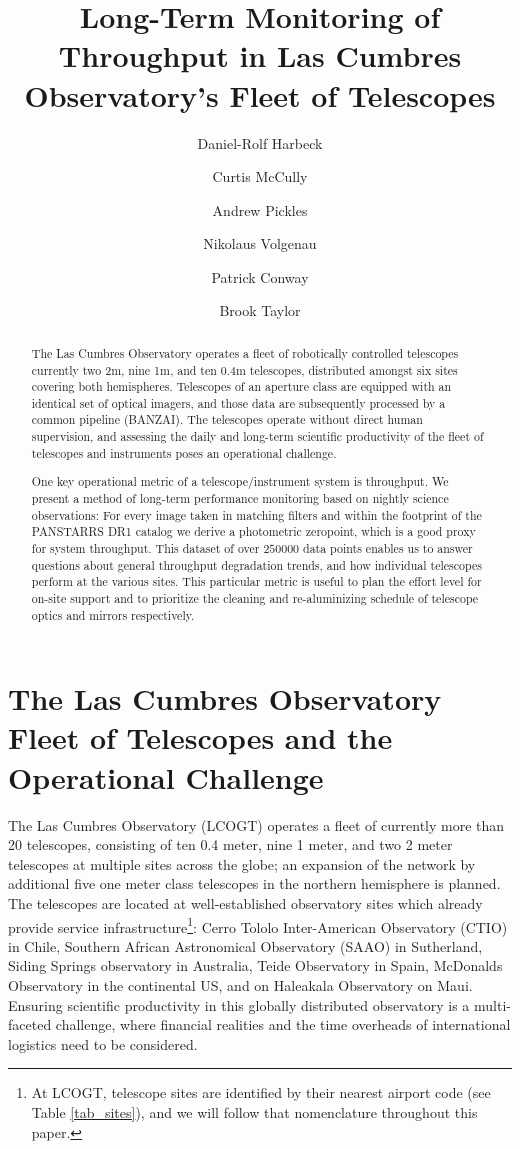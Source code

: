 \documentclass[]{spieman}
\title{Long-Term Monitoring of Throughput in Las Cumbres Observatory's Fleet of Telescopes}
\author[a]{Daniel-Rolf Harbeck}
\author[a]{Curtis McCully}
\author[a]{Andrew Pickles}
\author[a]{Nikolaus Volgenau}
\author[a]{Patrick Conway}
\author[a]{Brook Taylor}
\affil[a] {Las Cumbres Observatory, Goleta, CA (USA)}
\begin{document}
\maketitle

\begin{abstract}
The Las Cumbres Observatory operates a fleet of robotically controlled telescopes currently two 2m,
nine 1m, and ten 0.4m telescopes, distributed amongst six sites covering both hemispheres.
Telescopes of an aperture class are equipped with an identical set of optical imagers, and those
data are subsequently processed by a common pipeline (BANZAI). The telescopes operate without direct
human supervision, and assessing the daily and long-term scientific productivity of the fleet of
telescopes and instruments poses an operational challenge.

One key operational metric of a telescope/instrument system is throughput. We present a method of
long-term performance monitoring based on nightly science observations: For every image taken in
matching filters and within the footprint of the PANSTARRS DR1 catalog we derive a photometric
zeropoint, which is a good proxy for system throughput. This dataset of over $250000$ data points
enables us to answer questions about general throughput degradation trends, and how individual
telescopes perform at the various sites. This particular metric is useful to plan the effort level
for on-site support and to prioritize the cleaning and re-aluminizing schedule of telescope optics
and mirrors respectively.
\end{abstract}




\section{The Las Cumbres Observatory Fleet of Telescopes and the Operational Challenge}

The Las Cumbres Observatory (LCOGT) operates a fleet of currently more than 20 telescopes,
consisting of ten 0.4 meter, nine 1 meter, and two 2 meter telescopes at multiple sites across the
globe\cite{brown2013}; an expansion of the network by additional five one meter class telescopes in
the northern hemisphere is planned. The telescopes are located at well-established observatory sites
which already provide service infrastructure\footnote{At LCOGT, telescope sites are identified by
    their nearest airport code (see Table \ref{tab_sites}), and we will follow that nomenclature    
    throughout this paper.}: Cerro Tololo Inter-American Observatory (CTIO) in Chile, Southern 
    African
Astronomical Observatory (SAAO) in Sutherland, Siding Springs observatory in Australia, Teide
Observatory in Spain, McDonalds Observatory in the continental US, and on Haleakala Observatory on
Maui. Ensuring scientific productivity in this globally distributed observatory is a multi-faceted
challenge, where financial realities and the time overheads of international logistics need to be
considered.
\end{document}
